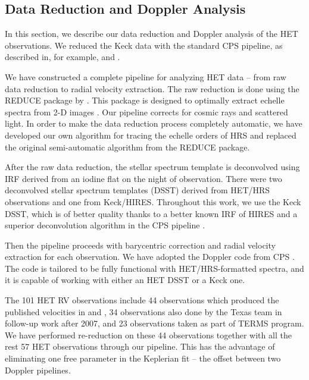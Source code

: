 \subsection{Data Reduction and Doppler Analysis}\label{sec:reduce}
In this section, we describe our data reduction and Doppler analysis
of the HET observations.  We reduced the Keck data with the standard
CPS pipeline, as described in, for example, \cite{2011ApJ...726...73H}
and \cite{2011ApJS..197...26J}.

We have constructed a complete pipeline for analyzing HET data -- from
raw data reduction to radial velocity extraction. The raw reduction is
done using the REDUCE package by \cite{2002A&A...385.1095P}. This
package is designed to optimally extract echelle spectra from 2-D
images \citep{1986PASP...98..609H}. Our pipeline corrects for cosmic
rays and scattered light.
In order to make the data reduction process completely automatic, we
have developed our own algorithm for tracing the echelle orders of HRS
and replaced the original semi-automatic algorithm from the REDUCE
package.

After the raw data reduction, the stellar spectrum template is
deconvolved using IRF derived from an iodine flat on the night of
observation. There were two deconvolved stellar spectrum templates
(DSST) derived from HET/HRS observations and one from
Keck/HIRES. Throughout this work, we use the Keck DSST, which is of
better quality thanks to a better known IRF of HIRES and a
superior deconvolution algorithm in the CPS pipeline
\citep{2009ApJ...696...75H, 2011ApJ...726...73H}.

Then the pipeline proceeds with barycentric correction and radial
velocity extraction for each observation. We have adopted the
Doppler code from CPS \citep[e.g.][]{
  2009ApJ...696...75H, 2011ApJ...726...73H, 2011ApJS..197...26J}. The
code is tailored to be fully functional with HET/HRS-formatted spectra,
and it is capable of working with either an HET DSST or a Keck one.

The 101 HET RV observations include 44 observations which
produced the published velocities in \cite{cochran2004} and
\cite{wit2007}, 34 observations also done by the Texas team in
follow-up work after 2007, and 23 observations taken as part of TERMS
program. We have performed re-reduction on these 44 observations
together with all the rest 57 HET observations through our
pipeline. This has the advantage of eliminating one free parameter in
the Keplerian fit -- the offset between two Doppler pipelines.

